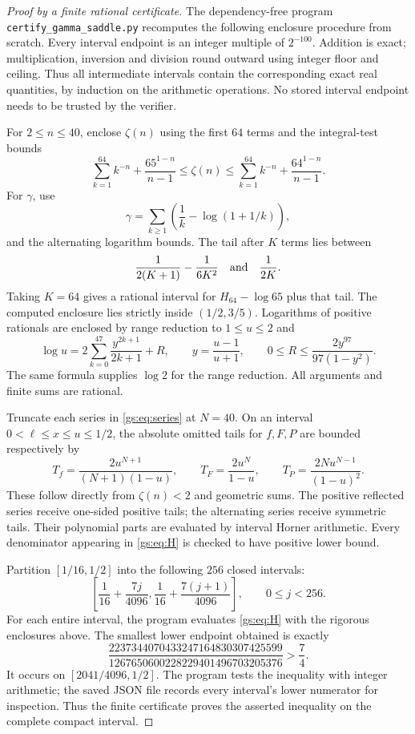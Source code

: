 \documentclass[11pt,a4paper]{article}
\numberwithin{equation}{section}
\theoremstyle{plain}
\theoremstyle{definition}
\theoremstyle{remark}
\begin{document}
\begin{proof}[Proof by a finite rational certificate]
The dependency-free program \texttt{certify\_gamma\_saddle.py}
recomputes the following enclosure procedure from scratch.
Every interval endpoint is an integer multiple of $2^{-100}$.
Addition is exact; multiplication, inversion and division round
outward using integer floor and ceiling. Thus all intermediate
intervals contain the corresponding exact real quantities, by induction
on the arithmetic operations. No stored interval endpoint needs to be
trusted by the verifier.

For $2\le n\le40$, enclose $\zeta(n)$ using the first $64$ terms
and the integral-test bounds
\[
 \sum_{k=1}^{64}k^{-n}+
       \frac{65^{1-n}}{n-1}
 \le\zeta(n)\le
 \sum_{k=1}^{64}k^{-n}+
       \frac{64^{1-n}}{n-1}.
\]
For $\gamma$, use
\[
 \gamma=\sum_{k\ge1}\left(\frac1k-\log(1+1/k)\right),
\]
and the alternating logarithm bounds. The tail after $K$ terms lies
between
\[
 \frac1{2(K+1)}-\frac1{6K^2}
 \quad\hbox{and}\quad\frac1{2K}.
\]
Taking $K=64$ gives a rational interval for
$H_{64}-\log65$ plus that tail. The computed enclosure lies strictly
inside $(1/2,3/5)$. Logarithms of positive rationals are enclosed by
range reduction to $1\le u\le2$ and
\[
 \log u=2\sum_{k=0}^{47}\frac{y^{2k+1}}{2k+1}+R,
 \qquad y=\frac{u-1}{u+1},\qquad
 0\le R\le\frac{2y^{97}}{97(1-y^2)}.
\]
The same formula supplies $\log2$ for the range reduction.
All arguments and finite sums are rational.

Truncate each series in \eqref{gs:eq:series} at $N=40$. On an interval
$0<\ell\le x\le u\le1/2$, the absolute omitted tails for $f,F,P$
are bounded respectively by
\begin{equation}\label{gs:eq:tail-bounds}
 T_f=\frac{2u^{N+1}}{(N+1)(1-u)},\qquad
 T_F=\frac{2u^N}{1-u},\qquad
 T_P=\frac{2Nu^{N-1}}{(1-u)^2}.
\end{equation}
These follow directly from $\zeta(n)<2$ and geometric sums.
The positive reflected series receive one-sided positive tails;
the alternating series receive symmetric tails. Their polynomial
parts are evaluated by interval Horner arithmetic. Every denominator
appearing in \eqref{gs:eq:H} is checked to have positive lower bound.

Partition $[1/16,1/2]$ into the following $256$ closed intervals:
\[
 \left[\frac1{16}+\frac{7j}{4096},
       \frac1{16}+\frac{7(j+1)}{4096}\right],
 \qquad 0\le j<256.
\]
For each entire interval, the program evaluates
\eqref{gs:eq:H} with the rigorous enclosures above. The smallest lower
endpoint obtained is exactly
\[
 \frac{2237344070433247164830307425599}
      {1267650600228229401496703205376}
 >\frac74.
\]
It occurs on $[2041/4096,1/2]$. The program tests the inequality
with integer arithmetic; the saved JSON file records every interval's
lower numerator for inspection. Thus the finite certificate proves
the asserted inequality on the complete compact interval.
\end{proof}
\end{document}
